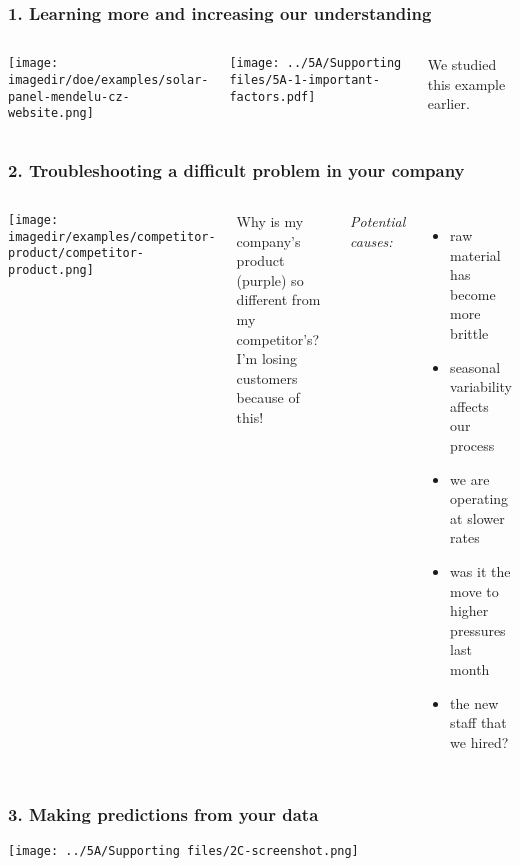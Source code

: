\begin{frame}\frametitle{1. Learning more and increasing our understanding}
	\begin{columns}[T]
			\texttt{[image: \\imagedir/doe/examples/solar-panel-mendelu-cz-website.png]}
			
			
			
			\texttt{[image: ../5A/Supporting files/5A-1-important-factors.pdf]}
		
			\vspace{.5cm}
			\color{myOrange}\tiny We studied this example earlier.
			
	\end{columns}
\end{frame}

\begin{frame}\frametitle{2. Troubleshooting a difficult problem in your company}
	\begin{columns}[T]
			\texttt{[image: \\imagedir/examples/competitor-product/competitor-product.png]}
			
			
			Why is {\color{purple} my company's product (purple)} so different from my {\color{red} competitor's}? \\
			I'm losing customers because of this!
			
			\vspace{0.5cm}
			{\color{blue}\emph{Potential causes:}}
			\begin{itemize}
				\item	raw material has become more brittle
				\item	seasonal variability affects our process
				\item	we are operating at slower rates
				\item	was it the move to higher pressures last month
				\item	the new staff that we hired?
			\end{itemize}
			
	\end{columns}
\end{frame}

\begin{frame}\frametitle{3. Making predictions from your data}
	\texttt{[image: ../5A/Supporting files/2C-screenshot.png]}
\end{frame}

